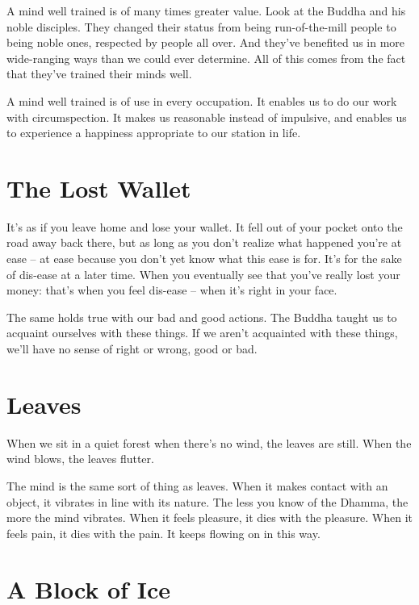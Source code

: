 A mind well trained is of many times greater value. Look at the Buddha and his noble disciples. They changed their status from being run-of-the-mill people to being noble ones, respected by people all over. And they've benefited us in more wide-ranging ways than we could ever determine. All of this comes from the fact that they've trained their minds well.

A mind well trained is of use in every occupation. It enables us to do our work with circumspection. It makes us reasonable instead of impulsive, and enables us to experience a happiness appropriate to our station in life.

\clearpage

\section{The Lost Wallet}

It's as if you leave home and lose your wallet. It fell out of your pocket onto the road away back there, but as long as you don't realize what happened you're at ease -- at ease because you don't yet know what this ease is for. It's for the sake of dis-ease at a later time. When you eventually see that you've really lost your money: that's when you feel dis-ease -- when it's right in your face. 

The same holds true with our bad and good actions. The Buddha taught us to acquaint ourselves with these things. If we aren't acquainted with these things, we'll have no sense of right or wrong, good or bad.

\section{Leaves}

When we sit in a quiet forest when there's no wind, the leaves are still. When the wind blows, the leaves flutter.

The mind is the same sort of thing as leaves. When it makes contact with an object, it vibrates in line with its nature. The less you know of the Dhamma, the more the mind vibrates. When it feels pleasure, it dies with the pleasure. When it feels pain, it dies with the pain. It keeps flowing on in this way. 

\clearpage

\section{A Block of Ice}

